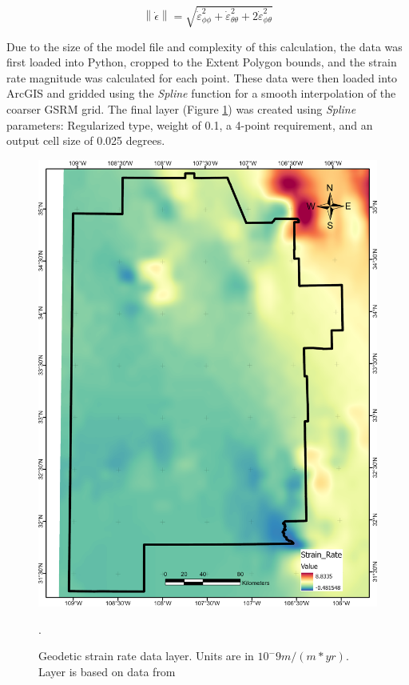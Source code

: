 \begin{equation}\label{eq:strainratemagnitude}
\left\lVert\dot{\epsilon}\right\rVert = \sqrt{\dot{\varepsilon}_{\phi\phi}^2+\dot{\varepsilon}_{\theta\theta}^2+2\dot{\varepsilon}_{\phi\theta}^2}
\end{equation}

Due to the size of the model file and complexity of this calculation, the data was first loaded into Python, cropped to the Extent Polygon bounds, and the strain rate magnitude was calculated for each point. These data were then loaded into ArcGIS and gridded using the \textit{Spline} function for a smooth interpolation of the coarser GSRM grid. The final layer (Figure \ref{fig:feat_strain}) was created using \textit{Spline} parameters: Regularized type, weight of 0.1, a 4-point requirement, and an output cell size of 0.025 degrees.

\begin{figure}[!htp]
\centering
\includegraphics[scale=.50]{templates/images/Figure-StrainRate.png}
\caption[Geodetic strain rate data layer]{Geodetic strain rate data layer. Units are in \(10^-9 m/(m*yr)\). Layer is based on data from \protect\citep{kreemer_geodetic_2014}}.
\label{fig:feat_strain}
\end{figure}

